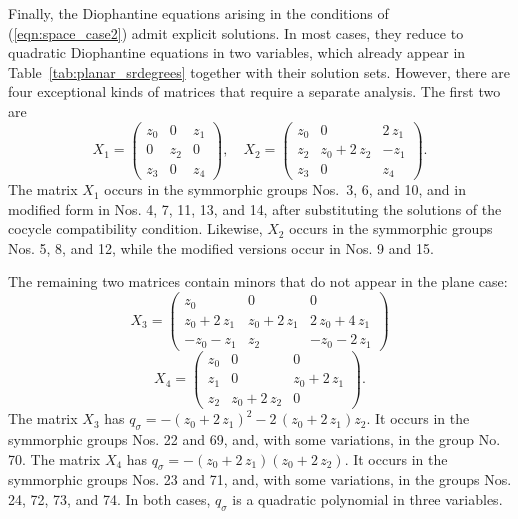 \documentclass[draft]{adm-paper}
\theoremstyle{definition}
\begin{document}
Finally, the Diophantine equations arising in the conditions of (\ref{eqn:space_case2}) admit explicit solutions.
In most cases, they reduce to quadratic Diophantine equations in two variables, which already appear
in Table~\ref{tab:planar_srdegrees} together with their solution sets. However, there are four exceptional kinds of
matrices that require a separate analysis. The first two are
$$X_1 = \left(\begin{array}{rrr}
z_{0} & 0 & z_{1} \\
0 & z_{2} & 0 \\
z_{3} & 0 & z_{4}
\end{array}\right),
\quad
X_2 = \left(\begin{array}{rrr}
z_{0} & 0 & 2 \, z_{1} \\
z_{2} & z_{0} + 2 \, z_{2} & -z_{1} \\
z_{3} & 0 & z_{4}
\end{array}\right).
$$
The matrix $X_1$ occurs in the symmorphic groups Nos.~3, 6, and 10, and in modified form in Nos. 4, 7, 11, 13, and 14,
after substituting the solutions of the cocycle compatibility condition.
Likewise, $X_2$ occurs in the symmorphic groups Nos. 5, 8, and 12, while the modified versions occur in Nos. 9 and 15.

The remaining two matrices contain minors that do not appear in the plane case:
\[
X_3 = \left(\begin{array}{rrr}
z_{0} & 0 & 0 \\
z_{0} + 2 \, z_{1} & z_{0} + 2 \, z_{1} & 2 \, z_{0} + 4 \, z_{1} \\
-z_{0} - z_{1} & z_{2} & -z_{0} - 2 \, z_{1}
\end{array}\right)
\]
\[
X_4 = \left(\begin{array}{rrr}
z_{0} & 0 & 0 \\
z_{1} & 0 & z_{0} + 2 \, z_{1} \\
z_{2} & z_{0} + 2 \, z_{2} & 0
\end{array}\right).
\]
The matrix $X_3$ has $q_\sigma = -{\left(z_{0} + 2 \, z_{1}\right)}^{2} - 2 \, {\left(z_{0} + 2 \, z_{1}\right)} z_{2}$.
It occurs in the symmorphic groups Nos. 22 and 69, and, with some variations, in the group No. 70.
The matrix $X_4$ has $q_\sigma = -{\left(z_{0} + 2 \, z_{1}\right)} {\left(z_{0} + 2 \, z_{2}\right)}$.
It occurs in the symmorphic groups Nos. 23 and 71, and, with some variations, in the groups Nos. 24, 72, 73, and 74.
In both cases, $q_\sigma$ is a quadratic polynomial in three variables.


\end{document}
